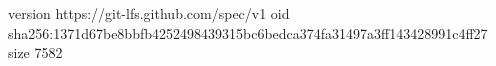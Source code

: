 version https://git-lfs.github.com/spec/v1
oid sha256:1371d67be8bbfb4252498439315bc6bedca374fa31497a3ff143428991c4ff27
size 7582
